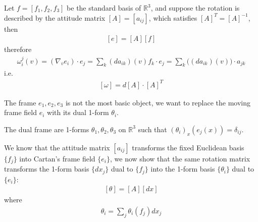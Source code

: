 \documentclass[10pt]{article}
\begin{document}
		\begin{proposition}
			Let $f = [f_1, f_2, f_3]$ be the standard basis of $\mathbb{R}^3$, and suppose the rotation is described by the attitude matrix $[A] = [a_{ij}]$, which satisfies $[A]^T = [A]^{-1}$, then
			\begin{equation*}
				\begin{aligned}
					[e] = [A][f]
				\end{aligned}
			\end{equation*}
			therefore
			\begin{equation*}
				\begin{aligned}
					\omega_i^j(v) = (\nabla_ve_i)\cdot e_j = \sum\limits_k(da_{ik})(v)f_k\cdot e_j = \sum\limits_k\big((da_{ik})(v)\big)\cdot a_{jk}
				\end{aligned}
			\end{equation*}
			i.e.
			\begin{equation*}
				\begin{aligned}
					[\omega] = d[A]\cdot [A]^T
				\end{aligned}
			\end{equation*}
		\end{proposition}
	
		The frame $e_1, e_2, e_3$ is not the most basic object, we want to replace the moving frame field $e_i$ with its dual 1-form $\theta_i$.
	
		\begin{definition}
			The dual frame are 1-forms $\theta_1, \theta_2, \theta_3$ on $\mathbb{R}^3$ such that $(\theta_i)_x(e_j(x)) = \delta_{ij}$.
		\end{definition}
	
		\begin{definition}
			We know that the attitude matrix $[a_{ij}]$ transforms the fixed Euclidean basis $\{f_j\}$ into Cartan's frame field $\{e_i\}$, we now show that the same rotation matrix transforms the 1-form basis $\{dx_j\}$ dual to $\{f_j\}$ into the 1-form basis $\{\theta_i\}$ dual to $\{e_i\}$:
			\begin{equation*}
				\begin{aligned}
					[\theta] = [A][dx]
				\end{aligned}
			\end{equation*}
			where
			\begin{equation*}
				\begin{aligned}
					\theta_i = \sum\limits_j\theta_i(f_j)dx_j
				\end{aligned}
			\end{equation*}
		\end{definition}
	
\end{document}
